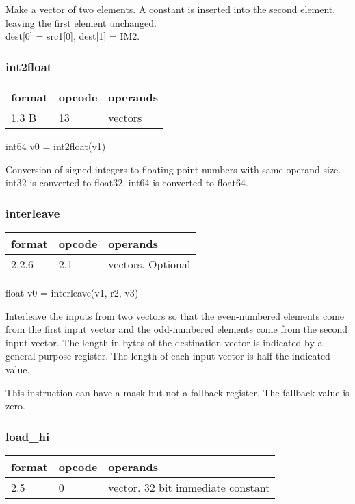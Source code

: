 \documentclass[forwardcom.tex]{subfiles}
\begin{document}
Make a vector of two elements. A constant is inserted into the second element, leaving the first element unchanged.\\
dest[0] = src1[0], dest[1] = IM2.
\vspace{2mm}


\subsubsection{int2float}
\label{table:int2floatInstruction}
\begin{tabular}{|p{12mm}|p{12mm}|p{110mm}|}
\hline
\bfseries format & \bfseries opcode & \bfseries operands \\ \hline
1.3 B & 13 & vectors \\ \hline
\end{tabular}
\vspace{2mm}

int64 v0 = int2float(v1)
\vspace{2mm}

Conversion of signed integers to floating point numbers with same operand size.\\
int32 is converted to float32. int64 is converted to float64.

\subsubsection{interleave}
\label{table:interleaveInstruction}
\begin{tabular}{|p{12mm}|p{12mm}|p{110mm}|}
\hline
\bfseries format & \bfseries opcode & \bfseries operands \\ \hline
2.2.6 & 2.1 & vectors. Optional \\ \hline
\end{tabular}
\vspace{2mm}

float v0 = interleave(v1, r2, v3)
\vspace{2mm}

Interleave the inputs from two vectors so that the even-numbered elements come from the first input vector and the odd-numbered elements come from the second input vector. The length in bytes of the destination vector is indicated by a general purpose register. The length of each input vector is half the indicated value.
\vspace{2mm}

This instruction can have a mask but not a fallback register. The fallback value is zero.

\subsubsection{load\_hi}
\label{table:loadHiInstruction}
\begin{tabular}{|p{12mm}|p{12mm}|p{110mm}|}
\hline
\bfseries format & \bfseries opcode & \bfseries operands \\ \hline
2.5 & 0 & vector. 32 bit immediate constant \\ \hline
\end{tabular}
\vspace{2mm}
\end{document}
